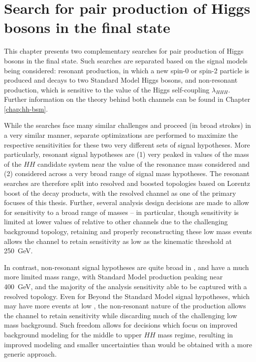 \chapter{Search for pair production of Higgs bosons in the \bbbb final state}
\label{chap:bbbb}

This chapter presents two complementary searches for pair production of 
Higgs bosons in the final state. Such searches are separated based on the 
signal models being considered: resonant production, in which a new spin-0 or 
spin-2 particle is produced and decays to two Standard Model Higgs bosons, and 
non-resonant production, which is sensitive to the value of the Higgs self-coupling
$\lambda_{HHH}$. Further information on the theory behind both channels can be 
found in Chapter \ref{chap:hh-bsm}.

While the searches face many similar challenges and proceed (in broad strokes) in a very 
similar manner, separate optimizations are performed to maximize the respective sensitivities 
for these two very different sets of signal hypotheses. More particularly, resonant signal 
hypotheses are (1) very peaked in values of the mass of the $HH$ candidate system near the 
value of the resonance mass considered and (2) considered across a very broad range of 
signal mass hypotheses. The resonant searches are therefore split into resolved and boosted 
topologies based on Lorentz boost of the decay products, with the resolved channel as one of the 
primary focuses of this thesis. Further, several analysis design decisions are made to 
allow for sensitivity to a broad range of masses -- in particular, though sensitivity is 
limited at lower values of \mhh relative to other channels  due to 
the challenging background topology, retaining and properly reconstructing these low mass events 
allows the \bbbb channel to retain sensitivity as low as the kinematic threshold at \SI{250}{\GeV}.

In contrast, non-resonant signal hypotheses are quite broad in \mhh, and have a much more limited 
mass range, with Standard Model production peaking near \SI{400}{GeV}, and the majority of the analysis 
sensitivity able to be captured with a resolved topology. Even for Beyond the Standard 
Model signal hypotheses, which may have more events at low \mhh, the non-resonant nature of the
production allows the \bbbb channel to retain sensitivity while discarding much of the challenging 
low mass background. Such freedom allows for decisions which focus on improved background modeling 
for the middle to upper $HH$ mass regime, resulting in improved modeling and smaller uncertainties 
than would be obtained with a more generic approach.

